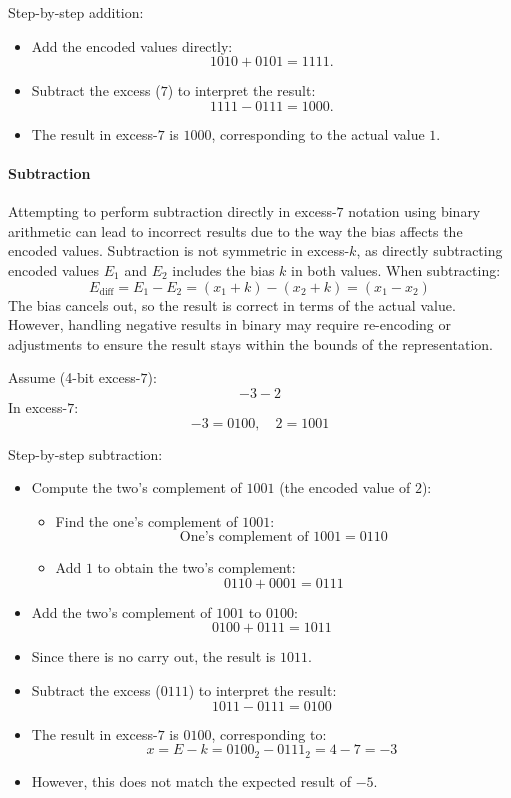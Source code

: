 Step-by-step addition:
\begin{itemize}
    \item Add the encoded values directly:
    \[
    1010 + 0101 = 1111.
    \]
    \item Subtract the excess (\( 7 \)) to interpret the result:
    \[
    1111 - 0111 = 1000.
    \]
    \item The result in excess-\( 7 \) is \( 1000 \), corresponding to the actual value \( 1 \).
\end{itemize}

\paragraph{Subtraction}
Attempting to perform subtraction directly in excess-\( 7 \) notation using binary arithmetic can lead to incorrect results due to the way the bias affects the encoded values. Subtraction is not symmetric in excess-\( k \), as directly subtracting encoded values \( E_1 \) and \( E_2 \) includes the bias \( k \) in both values. When subtracting:
\[
E_{\text{diff}} = E_1 - E_2 = (x_1 + k) - (x_2 + k) = (x_1 - x_2)
\]
The bias cancels out, so the result is correct in terms of the actual value. However, handling negative results in binary may require re-encoding or adjustments to ensure the result stays within the bounds of the representation.

 \vspace{\baselineskip}\par
Assume (4-bit excess-\( 7 \)):
\[
-3 - 2
\]
In excess-\( 7 \):
\[
-3 = 0100, \quad 2 = 1001
\]

Step-by-step subtraction:
\begin{itemize}
    \item Compute the two's complement of \( 1001 \) (the encoded value of \( 2 \)):
    \begin{itemize}[noitemsep, left=1.5cm]
        \item Find the one's complement of \( 1001 \):
        \[
        \text{One's complement of } 1001 = 0110
        \]
        \item Add \( 1 \) to obtain the two's complement:
        \[
        0110 + 0001 = 0111
        \]
    \end{itemize}
    \item Add the two's complement of \( 1001 \) to \( 0100 \):
    \[
    0100 + 0111 = 1011
    \]
    \item Since there is no carry out, the result is \( 1011 \).
    \item Subtract the excess (\( 0111 \)) to interpret the result:
    \[
    1011 - 0111 = 0100
    \]
    \item The result in excess-\( 7 \) is \( 0100 \), corresponding to:
    \[
    x = E - k = 0100_2 - 0111_2 = 4 - 7 = -3
    \]
    \item However, this does not match the expected result of \( -5 \).
\end{itemize}

